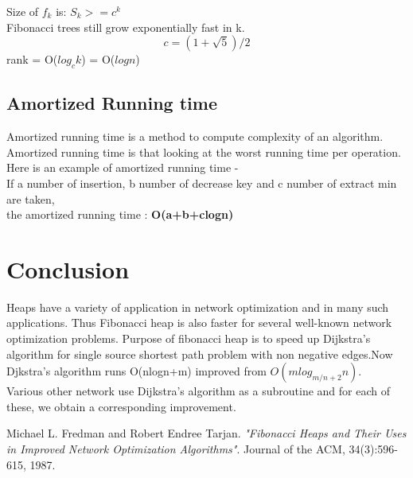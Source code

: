 \documentclass[14pt,a4paper]{report}
\begin{document}
\bigskip
\hspace{-0.65cm}
Size of $f_k$ is: $S_{k} >= c^{k}$ \\
Fibonacci trees still grow exponentially fast in k.\\
$$c= (1+\sqrt{5})/2$$
rank = O($log_{c} k$) = O($log n$)

\section{Amortized Running time}
Amortized running time is a method to compute complexity of an algorithm. Amortized running time is that looking at the worst running time per operation.
Here is an example of amortized running time -\\
If a number of insertion, b number of decrease key and c number of extract min are taken,\\ the amortized running time :
\textbf{O(a+b+clogn)}\\[0.5cm]
\chapter{Conclusion}
\par
Heaps have a variety of application in network optimization and in many such applications. Thus Fibonacci heap is also faster for several well-known network optimization problems. Purpose of fibonacci heap is to speed up Dijkstra's algorithm for single source shortest path problem with non negative edges.Now Djkstra's algorithm runs O(nlogn+m) improved from $O(mlog_{m/n+2}n)$\cite{one}.\\
Various other network use Dijkstra's algorithm as a subroutine and for each of these, we obtain a corresponding improvement.
\\[0.5cm]
\begin{thebibliography}{9}
Michael L. Fredman and Robert Endree Tarjan.
\textit{"Fibonacci Heaps and Their Uses in Improved Network Optimization Algorithms"}. Journal of the ACM, 34(3):596-615, 1987.
\end{thebibliography}
\end{document}
